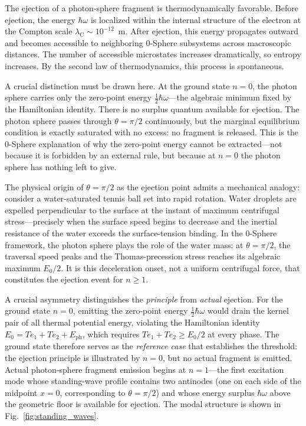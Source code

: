 \documentclass[%
 reprint, amsmath,amssymb, aps, prb, ]{revtex4-2}
\numberwithin{equation}{section}
\newcommand{\iphase}{\theta}
\newcommand{\lambdaC}{\lambda_{\mathrm{C}}}
\begin{document}
The ejection of a photon-sphere fragment is thermodynamically favorable. Before ejection, the energy $\hbar\omega$ is localized within the internal structure of the electron at the Compton scale $\lambdaC \sim 10^{-12}$~m. After ejection, this energy propagates outward and becomes accessible to neighboring 0-Sphere subsystems across macroscopic distances. The number of accessible microstates increases dramatically, so entropy increases. By the second law of thermodynamics, this process is spontaneous.

A crucial distinction must be drawn here. At the ground state $n=0$, the photon sphere carries only the zero-point energy $\tfrac{1}{2}\hbar\omega$---the algebraic minimum fixed by the Hamiltonian identity. There is no surplus quantum available for ejection. The photon sphere passes through $\iphase = \pi/2$ continuously, but the marginal equilibrium condition is exactly saturated with no excess: no fragment is released. This is the 0-Sphere explanation of why the zero-point energy cannot be extracted---not because it is forbidden by an external rule, but because at $n=0$ the photon sphere has nothing left to give.

The physical origin of $\theta = \pi/2$ as the ejection point admits a mechanical analogy: consider a water-saturated tennis ball set into rapid rotation. Water droplets are expelled perpendicular to the surface at the instant of maximum centrifugal stress---precisely when the surface speed begins to decrease and the inertial resistance of the water exceeds the surface-tension binding. In the 0-Sphere framework, the photon sphere plays the role of the water mass: at $\theta = \pi/2$, the traversal speed peaks and the Thomas-precession stress reaches its algebraic maximum $E_0/2$. It is this deceleration onset, not a uniform centrifugal force, that constitutes the ejection event for $n \geq 1$.

A crucial asymmetry distinguishes the \emph{principle} from \emph{actual} ejection. For the ground state $n = 0$, emitting the zero-point energy $\tfrac{1}{2}\hbar\omega$ would drain the kernel pair of all thermal potential energy, violating the Hamiltonian identity $E_0 = Te_1 + Te_2 + E_{\text{ph}}$, which requires $Te_1 + Te_2 \geq E_0/2$ at every phase. The ground state therefore serves as the \emph{reference case} that establishes the threshold: the ejection principle is illustrated by $n=0$, but no actual fragment is emitted. Actual photon-sphere fragment emission begins at $n = 1$---the first excitation mode whose standing-wave profile contains two antinodes (one on each side of the midpoint $x=0$, corresponding to $\theta = \pi/2$) and whose energy surplus $\hbar\omega$ above the geometric floor is available for ejection. The modal structure is shown in Fig.~\ref{fig:standing_waves}.
\end{document}
